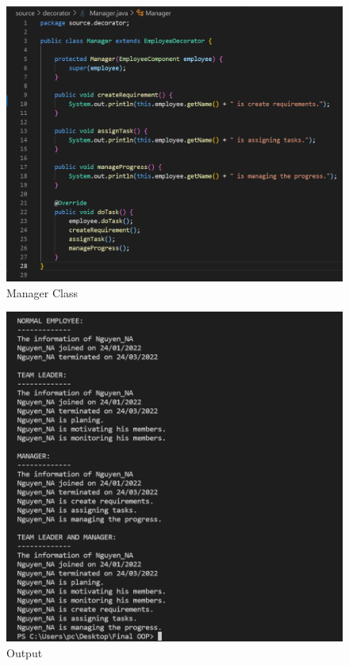 \begin{figure}[!htb]
    \centering
    \includegraphics[width=\textwidth]{fig/Decorator/manager_class.png}
    \caption{Manager Class}
    \label{fig:manager_class}
\end{figure}
\newpage
\begin{figure}[!htb]
    \centering
    \includegraphics[width=\textwidth]{fig/Decorator/decorator_output.png}
    \caption{Output}
    \label{fig:decorator_output}
\end{figure}


